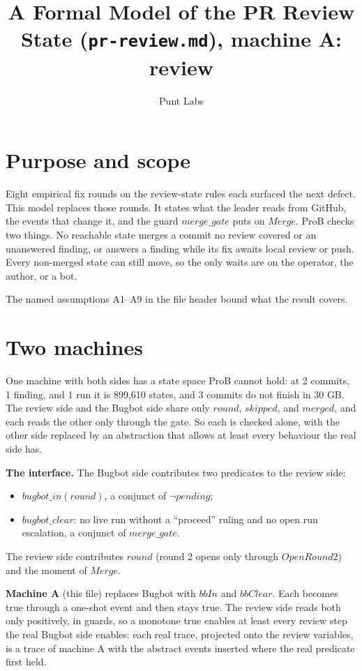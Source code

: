\documentclass{article}
\begin{document}
\title{A Formal Model of the PR Review State (\texttt{pr-review.md}), machine A: review}
\author{Punt Labs}
\maketitle

\section{Purpose and scope}

Eight empirical fix rounds on the review-state rules each surfaced the next
defect. This model replaces those rounds. It states what the leader reads from
GitHub, the events that change it, and the guard $merge\_gate$ puts on
$Merge$. ProB checks two things. No reachable state merges a commit no review
covered or an unanswered finding, or answers a finding while its fix awaits
local review or push.
Every non-merged state can still move, so the only waits are on the operator,
the author, or a bot.

The named assumptions A1--A9 in the file header bound what the result covers.

\section{Two machines}

One machine with both sides has a state space ProB cannot hold: at 2 commits,
1 finding, and 1 run it is 899,610 states, and 3 commits do not finish in
30 GB. The review side and the Bugbot side share only $round$, $skipped$, and
$merged$, and each reads the other only through the gate. So each is checked
alone, with the other side replaced by an abstraction that allows at least
every behaviour the real side has.

\textbf{The interface.} The Bugbot side contributes two predicates to the
review side:
\begin{itemize}
\item $bugbot\_in(round)$, a conjunct of $\lnot pending$;
\item $bugbot\_clear$: no live run without a ``proceed'' ruling and no open
  run escalation, a conjunct of $merge\_gate$.
\end{itemize}
The review side contributes $round$ (round 2 opens only through
$OpenRound2$) and the moment of $Merge$.

\textbf{Machine A} (this file) replaces Bugbot with $bbIn$ and $bbClear$.
Each becomes true through a one-shot event and then stays true. The review
side reads both only positively, in guards, so a monotone true enables at least
every review step the real Bugbot side enables: each real trace, projected onto
the review variables, is a trace of machine A with the abstract events
inserted where the real predicate first held.
\end{document}
